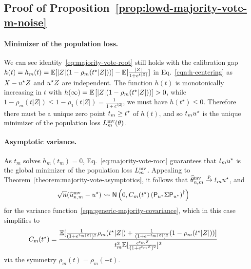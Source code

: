\subsection{Proof of Proposition~\ref{prop:lowd-majority-vote-m-noise}}
\label{proof:lowd-majority-vote-m-noise}

\paragraph{Minimizer of the population loss.}
We can see identity~\eqref{eq:majority-vote-root} still holds with the
calibration gap $h(t) = h_m(t) = \mathbb{E}[|Z|(1 - \rho_m(t^\star |Z|))] -
\mathbb{E}[\frac{|Z|}{1 + e^{t|Z|}}]$ in Eq.~\eqref{eqn:h-centering} as $X-u^\star Z$
and $u^\star Z$ are independent. The function $h(t)$ is monotonically
increasing in $t$ with $h(\infty) =\mathbb{E} \left[{|Z|(1-\rho_m(t^\star |Z|))}\right] >
0$, while $1 - \rho_m(t|Z|) \leq 1 - \rho_1(t|Z|) = \frac{1}{1 + e^{t|Z|}}$,
we must have $h(t^\star) \leq 0$. Therefore there must be a unique zero
point $t_m \ge t^\star$ of $h(t)$, and so $t_m u^\star$ is the unique minimizer
of the population loss $L^{\textup{mv}}_m(\theta)$.

\paragraph{Asymptotic variance.}
As $t_m$ solves $h_m(t_m) = 0$, 
Eq.~\eqref{eq:majority-vote-root} guarantees that $t_m u^\star$ is the global
minimizer of the population loss $L^{\textup{mv}}_m$. Appealing to
Theorem~\ref{theorem:majority-vote-asymptotics}, it follows that
$\widehat{\theta}^{\textup{mv}}_{n,m} \stackrel{p}{\rightarrow} t_m u^\star$, and
\begin{align*}
  \sqrt{n} (\widehat{u}^{\textup{mv}}_{n,m} -  u^\star)&\rightsquigarrow \mathsf{N}\left(0, C_m(t^\star)
  \left({\mathsf{P}_{u^\star} \Sigma \mathsf{P}_{u^\star}}\right)^\dagger\right)
\end{align*}
for the variance function~\eqref{eqn:generic-majority-covariance},
which in this case simplifies to
\begin{align*}
  C_m(t^\star)
  & = \frac{\mathbb{E}[\frac{1}{(1 + e^{t_m|Z|})^2} \rho_m(t^\star |Z|)
      + \frac{1}{(1 + e^{-t_m|Z|})^2} (1-\rho_m(t^\star |Z|)) ]}{
    t_m^2 \mathbb{E}[\frac{e^{t_m Z} }{ (1 + e^{t_m Z})^2}]^2}
\end{align*}
via the symmetry $\rho_m(t) = \rho_m(-t)$.

